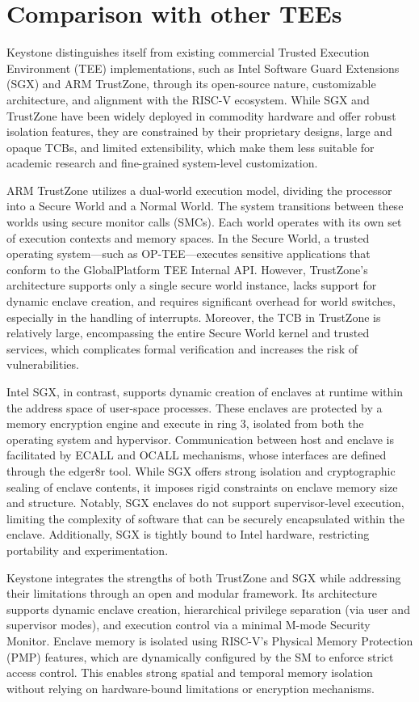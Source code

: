 \section{Comparison with other TEEs}

Keystone distinguishes itself from existing commercial Trusted Execution Environment (TEE) implementations, such as Intel Software Guard Extensions (SGX) and ARM TrustZone, through its open-source nature, customizable architecture, and alignment with the RISC-V ecosystem. While SGX and TrustZone have been widely deployed in commodity hardware and offer robust isolation features, they are constrained by their proprietary designs, large and opaque TCBs, and limited extensibility, which make them less suitable for academic research and fine-grained system-level customization.

ARM TrustZone utilizes a dual-world execution model, dividing the processor into a Secure World and a Normal World. The system transitions between these worlds using secure monitor calls (SMCs). Each world operates with its own set of execution contexts and memory spaces. In the Secure World, a trusted operating system—such as OP-TEE—executes sensitive applications that conform to the GlobalPlatform TEE Internal API. However, TrustZone’s architecture supports only a single secure world instance, lacks support for dynamic enclave creation, and requires significant overhead for world switches, especially in the handling of interrupts. Moreover, the TCB in TrustZone is relatively large, encompassing the entire Secure World kernel and trusted services, which complicates formal verification and increases the risk of vulnerabilities.

Intel SGX, in contrast, supports dynamic creation of enclaves at runtime within the address space of user-space processes. These enclaves are protected by a memory encryption engine and execute in ring 3, isolated from both the operating system and hypervisor. Communication between host and enclave is facilitated by ECALL and OCALL mechanisms, whose interfaces are defined through the edger8r tool. While SGX offers strong isolation and cryptographic sealing of enclave contents, it imposes rigid constraints on enclave memory size and structure. Notably, SGX enclaves do not support supervisor-level execution, limiting the complexity of software that can be securely encapsulated within the enclave. Additionally, SGX is tightly bound to Intel hardware, restricting portability and experimentation.

Keystone integrates the strengths of both TrustZone and SGX while addressing their limitations through an open and modular framework. Its architecture supports dynamic enclave creation, hierarchical privilege separation (via user and supervisor modes), and execution control via a minimal M-mode Security Monitor. Enclave memory is isolated using RISC-V’s Physical Memory Protection (PMP) features, which are dynamically configured by the SM to enforce strict access control. This enables strong spatial and temporal memory isolation without relying on hardware-bound limitations or encryption mechanisms.


